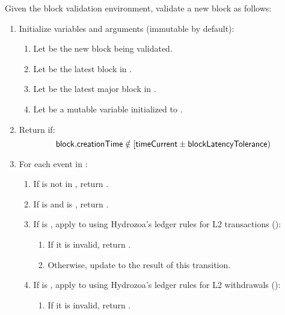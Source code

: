 \documentclass[../hydrozoa.tex]{subfiles}
\begin{document}
Given the block validation environment, validate a new block as follows:
\begin{enumerate}
  \item Initialize variables and arguments (immutable by default):
    \begin{enumerate}
      \item Let  be the new block being validated.
      \item Let  be the latest block in .
      \item Let  be the latest major block in .
      \item Let  be a mutable variable initialized to .
    \end{enumerate}
  \item Return  if:
    \begin{equation*}
      \mathsf{block.creationTime} \notin [\mathsf{timeCurrent} \pm \mathsf{blockLatencyTolerance})
    \end{equation*}
  \item For each event  in :
    \begin{enumerate}
      \item If  is not in , return .
      \item If  is  and  is , return .
      \item If  is , apply  to  using Hydrozoa's ledger rules for L2 transactions ():
        \begin{enumerate}
          \item If it is invalid, return .
          \item Otherwise, update  to the result of this transition.
        \end{enumerate}
      \item If  is , apply  to  using Hydrozoa's ledger rules for L2 withdrawals ():
        \begin{enumerate}
          \item If it is invalid, return .

\end{enumerate}
\end{enumerate}
\end{enumerate}
\end{document}
